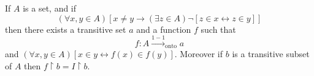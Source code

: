 If $A$ is a set, and if
$$(\forall x, y \in A)[x \neq y \rightarrow (\exists z \in A) \neg [z \in x \leftrightarrow z \in y]]$$
then there exists a transitive set $a$ and a function $f$ such that
$$f: A \xrightarrow{1-1}_{\text{onto}} a$$
and $(\forall x, y \in A)[x \in y \leftrightarrow f(x) \in f(y)]$. Moreover if $b$ is a transitive subset of $A$ then $f \upharpoonright b = I \upharpoonright b$.
